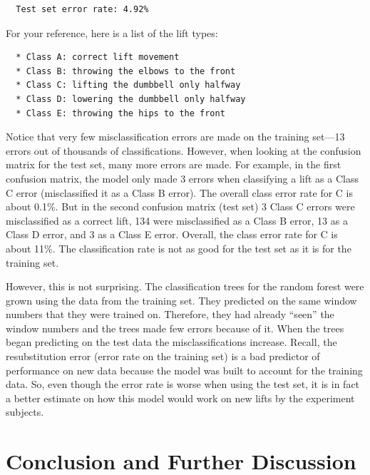 \documentclass[12pt,twoside]{reedthesis}
\begin{document}
  \begin{verbatim}
  Test set error rate: 4.92%
  \end{verbatim}
  
  For your reference, here is a list of the lift types:
  
  \begin{verbatim}
  * Class A: correct lift movement
  * Class B: throwing the elbows to the front
  * Class C: lifting the dumbbell only halfway
  * Class D: lowering the dumbbell only halfway
  * Class E: throwing the hips to the front
  \end{verbatim}
  
  Notice that very few misclassification errors are made on the training
  set---13 errors out of thousands of classifications. However, when
  looking at the confusion matrix for the test set, many more errors are
  made. For example, in the first confusion matrix, the model only made 3
  errors when classifying a lift as a Class C error (misclassified it as a
  Class B error). The overall class error rate for C is about 0.1\%. But
  in the second confusion matrix (test set) 3 Class C errors were
  misclassified as a correct lift, 134 were misclassified as a Class B
  error, 13 as a Class D error, and 3 as a Class E error. Overall, the
  class error rate for C is about 11\%. The classification rate is not as
  good for the test set as it is for the training set.
  
  However, this is not surprising. The classification trees for the random
  forest were grown using the data from the training set. They predicted
  on the same window numbers that they were trained on. Therefore, they
  had already ``seen'' the window numbers and the trees made few errors
  because of it. When the trees began predicting on the test data the
  misclassifications increase. Recall, the resubstitution error (error
  rate on the training set) is a bad predictor of performance on new data
  because the model was built to account for the training data. So, even
  though the error rate is worse when using the test set, it is in fact a
  better estimate on how this model would work on new lifts by the
  experiment subjects.
  
  \chapter*{Conclusion and Further
  Discussion}\label{conclusion-and-further-discussion}
  
\end{document}
